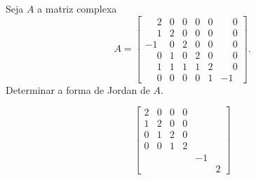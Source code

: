 \documentclass[12pt]{exam}
\begin{document}
\begin{exercicio}
  Seja $A$ a matriz complexa
  \[
      A = \begin{bmatrix}
        \phantom{-} 2 & 0 & 0 & 0 & 0 & \phantom{-} 0\\
        \phantom{-} 1 & 2 & 0 & 0 & 0 & \phantom{-} 0\\
        -1 & 0 & 2 & 0 & 0 & \phantom{-} 0\\
        \phantom{-} 0 & 1 & 0 & 2 & 0 & \phantom{-} 0\\
        \phantom{-} 1 & 1 & 1 & 1 & 2 & \phantom{-} 0\\
        \phantom{-} 0 & 0 & 0 & 0 & 1 & -1
      \end{bmatrix}.
  \]
  Determinar a forma de Jordan de $A$.
  \begin{solucao}
    \[
      \begin{bmatrix}
        2 & 0 & 0 & 0 \\
        1 & 2 & 0 & 0\\
        0 & 1 & 2 & 0\\
        0 & 0 & 1 & 2\\
         & & & & -1\\
         & & & & & 2
      \end{bmatrix}
    \]
  \end{solucao}
\end{exercicio}
\end{document}
